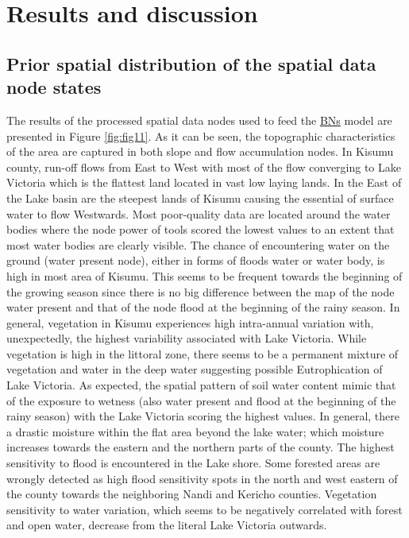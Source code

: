 \documentclass[12pt,oneside]{article}
\begin{document}
\hypertarget{II}{%
\section{Results and discussion}\label{II}}

\hypertarget{II4}{%
\subsection{Prior spatial distribution of the spatial data node states}\label{II4}}

The results of the processed spatial data nodes used to feed the \href{https://en.wikipedia.org/wiki/Bayesian_network}{BNs} model are presented in Figure \ref{fig:fig11}. As it can be seen, the topographic characteristics of the area are captured in both slope and flow accumulation nodes. In Kisumu county, run-off flows from East to West with most of the flow converging to Lake Victoria which is the flattest land located in vast low laying lands. In the East of the Lake basin are the steepest lands of Kisumu causing the essential of surface water to flow Westwards. Most poor-quality data are located around the water bodies where the node power of tools scored the lowest values to an extent that most water bodies are clearly visible. The chance of encountering water on the ground (water present node), either in forms of floods water or water body, is high in most area of Kisumu. This seems to be frequent towards the beginning of the growing season since there is no big difference between the map of the node water present and that of the node flood at the beginning of the rainy season. In general, vegetation in Kisumu experiences high intra-annual variation with, unexpectedly, the highest variability associated with Lake Victoria. While vegetation is high in the littoral zone, there seems to be a permanent mixture of vegetation and water in the deep water suggesting possible Eutrophication of Lake Victoria. As expected, the spatial pattern of soil water content mimic that of the exposure to wetness (also water present and flood at the beginning of the rainy season) with the Lake Victoria scoring the highest values. In general, there a drastic moisture within the flat area beyond the lake water; which moisture increases towards the eastern and the northern parts of the county. The highest sensitivity to flood is encountered in the Lake shore. Some forested areas are wrongly detected as high flood sensitivity spots in the north and west eastern of the county towards the neighboring Nandi and Kericho counties. Vegetation sensitivity to water variation, which seems to be negatively correlated with forest and open water, decrease from the literal Lake Victoria outwards.
\end{document}

